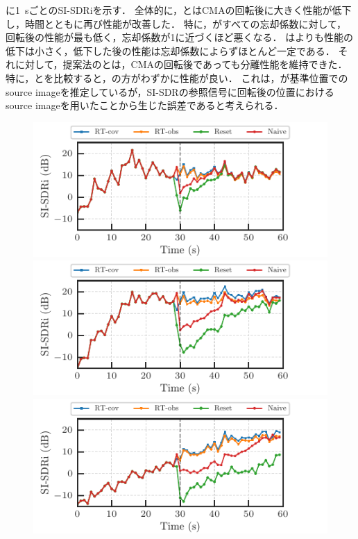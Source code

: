 \documentclass[sip,biber]{now-journal}
\begin{document}
に\SI{1}{\second}ごとのSI-SDRiを示す．
全体的に，\NaiveIVA{}と\ResetIVA{}はCMAの回転後に大きく性能が低下し，時間とともに再び性能が改善した．
特に，\ResetIVA{}がすべての忘却係数に対して，回転後の性能が最も低く，忘却係数が1に近づくほど悪くなる．
\NaiveIVA{}は\ResetIVA{}よりも性能の低下は小さく，低下した後の性能は忘却係数によらずほとんど一定である．
それに対して，提案法の\RTCov{}と\RTObs{}は，CMAの回転後であっても分離性能を維持できた．
特に，\RTCov{}と\RTObs{}を比較すると，\RTCov{}の方がわずかに性能が良い．
これは，\RTObs{}が基準位置でのsource imageを推定しているが，SI-SDRの参照信号に回転後の位置におけるsource imageを用いたことから生じた誤差であると考えられる．
\begin{figure}[t]
  \begin{minipage}[t]{\linewidth}
    \centering\includegraphics{figures/plots/online/Gauss_8000_fft4096_900.pdf}\label{fig:plot:gauss:900}
    \centering\includegraphics{figures/plots/online/Gauss_8000_fft4096_950.pdf}\label{fig:plot:gauss:950}
    \centering\includegraphics{figures/plots/online/Gauss_8000_fft4096_980.pdf}\label{fig:plot:gauss:980}

\end{minipage}
\end{figure}
\end{document}
